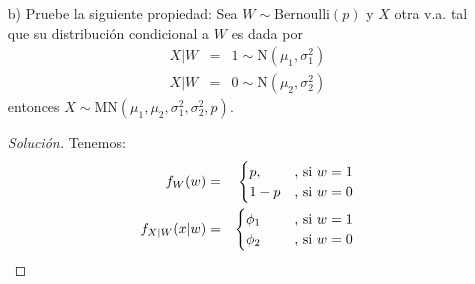 \documentclass[11pt]{article}
\renewcommand{\=}[1]{\stackrel{#1}{=}} %
\newenvironment{sol}
{\begin{proof}[Solución]}
	{\end{proof}}
\theoremstyle{definition}
\theoremstyle{remark}
\begin{document}
\begin{itemize}
\begin{sol}
		Por tanto, usando (3) y (4):
		\begin{eqnarray}
		\text{Var}\left[X\right] &=& \text{E}\left[X^2\right] - \text{E}\left[X\right]^2\nonumber\\
		&=& p\left(\sigma_1^2 + \mu_1^2\right) + (1-p)\left(\sigma_2^2 + \mu_2^2\right) - \left(p\mu_1 + (1-p)\mu_2\right)^2\nonumber\\
		&=& p(1-p)(\mu_1-\mu_2)^2 + p\sigma_1^2 + (1-p)\sigma_2^2.
		\end{eqnarray}
	\end{sol}
\newpage
	\item[b)] Pruebe la siguiente propiedad:
	Sea $W \sim \text{Bernoulli}(p)$ y $X$ otra v.a. tal que su distribución condicional a $W$ es dada por
	\begin{eqnarray}
	X | W &=& 1 \sim \text{N}(\mu_1,\sigma_1^2)\nonumber\\
	X | W &=& 0 \sim \text{N}(\mu_2,\sigma_2^2)\nonumber
	\end{eqnarray}
	entonces $X \sim \text{MN}(\mu_1,\mu_2,\sigma_1^2,\sigma_2^2,p)$.
	\begin{sol}
		Tenemos:
		\begin{eqnarray}
		f_W(w) &=& \begin{cases}
		p,  & \text{, si $w = 1$} \\
		1-p & \text{, si $w = 0$}
		\end{cases}\\
		f_{X|W}(x|w) & =& \begin{cases}
		\phi_1  &\hspace*{0.5cm} \text{, si $w = 1$} \\
		\phi_2 &\hspace*{0.5cm} \text{, si $w = 0$}
		\end{cases}
		\end{eqnarray}
		

\end{sol}
\end{itemize}
\end{document}
